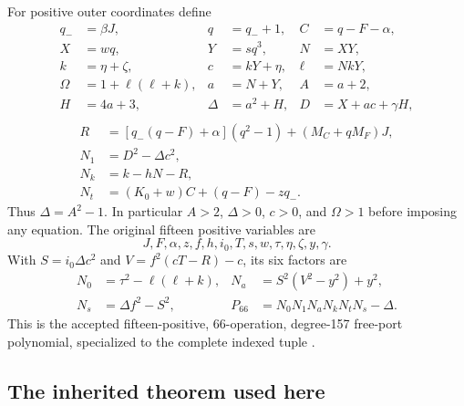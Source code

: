\documentclass[11pt,letterpaper]{article}
\theoremstyle{remark}\newtheorem{remark}[theorem]{Remark}
\begin{document}
For positive outer coordinates define
\begin{align*}
q_-&=\beta J,& q&=q_-+1,& C&=q-F-\alpha,\\
X&=wq,& Y&=sq^3,& N&=XY,\\
k&=\eta+\zeta,& c&=kY+\eta,& \ell&=NkY,\\
\Omega&=1+\ell(\ell+k),& a&=N+Y,& A&=a+2,\\
H&=4a+3,& \Delta&=a^2+H,& D&=X+ac+\gamma H,\\
\end{align*}
\begin{align*}
R&=[q_-(q-F)+\alpha](q^2-1)+(M_C+qM_F)J,\\
N_1&=D^2-\Delta c^2,\\
N_k&=k-hN-R,\\
N_t&=(K_0+w)C+(q-F)-zq_-.
\end{align*}
Thus $\Delta=A^2-1$. In particular $A>2$, $\Delta>0$, $c>0$, and $\Omega>1$ before imposing
any equation. The original fifteen positive variables are
\[
J,F,\alpha,z,f,h,i_0,T,s,w,\tau,\eta,\zeta,y,\gamma.
\]
With $S=i_0\Delta c^2$ and $V=f^2(cT-R)-c$, its six factors are
\begin{align*}
N_0&=\tau^2-\ell(\ell+k),&
N_a&=S^2(V^2-y^2)+y^2,\\
N_s&=\Delta f^2-S^2,&
P_{66}&=N_0N_1N_aN_kN_tN_s-\Delta.
\end{align*}
This is the accepted fifteen-positive, 66-operation, degree-157 free-port
polynomial, specialized to the complete indexed tuple \cite{p66}.

\subsection{The inherited theorem used here}
\end{document}

